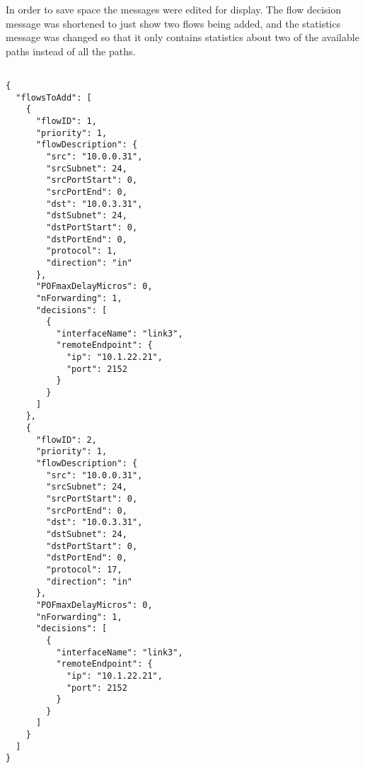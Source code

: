 In order to save space the messages were edited for display. The flow decision message was shortened to just show two flows being added, and the statistics message was changed so that it only contains statistics about two of the available paths instead of all the paths.

\clearpage

\begin{lstlisting}[style=json, caption={Format of Flow Forwarding Decisions from Control Plane}, label={lst:flow}]

{
  "flowsToAdd": [
    {
      "flowID": 1,
      "priority": 1,
      "flowDescription": {
        "src": "10.0.0.31",
        "srcSubnet": 24,
        "srcPortStart": 0,
        "srcPortEnd": 0,
        "dst": "10.0.3.31",
        "dstSubnet": 24,
        "dstPortStart": 0,
        "dstPortEnd": 0,
        "protocol": 1,
        "direction": "in"
      },
      "POFmaxDelayMicros": 0,
      "nForwarding": 1,
      "decisions": [
        {
          "interfaceName": "link3",
          "remoteEndpoint": {
            "ip": "10.1.22.21",
            "port": 2152
          }
        }
      ]
    },
    {
      "flowID": 2,
      "priority": 1,
      "flowDescription": {
        "src": "10.0.0.31",
        "srcSubnet": 24,
        "srcPortStart": 0,
        "srcPortEnd": 0,
        "dst": "10.0.3.31",
        "dstSubnet": 24,
        "dstPortStart": 0,
        "dstPortEnd": 0,
        "protocol": 17,
        "direction": "in"
      },
      "POFmaxDelayMicros": 0,
      "nForwarding": 1,
      "decisions": [
        {
          "interfaceName": "link3",
          "remoteEndpoint": {
            "ip": "10.1.22.21",
            "port": 2152
          }
        }
      ]
    }
  ]
}


\end{lstlisting}

\clearpage

